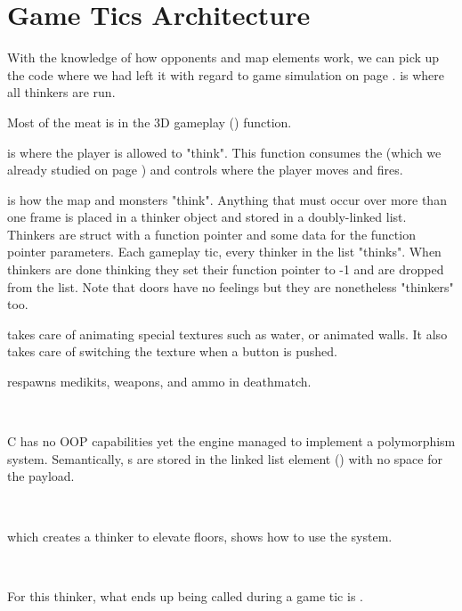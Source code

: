 \section{Game Tics Architecture}
With the knowledge of how opponents and map elements work, we can pick up the code where we had left it with regard to game simulation on page \pageref{TryRunTics.c}.  is where all thinkers are run.\\
\par
{}
\par
Most of the meat is in the 3D gameplay () function.\\
\par
{}
\par
{} is where the player is allowed to "think". This function consumes the  (which we already studied on page \pageref{cmd_t_type}) and controls where the player moves and fires.\\
\par 
{} is how the map and monsters "think". Anything that must occur over more than one frame is placed in a thinker object and stored in a doubly-linked list. Thinkers are struct with a function pointer and some data for the function pointer parameters. Each gameplay tic, every thinker in the list "thinks". When thinkers are done thinking they set their function pointer to -1 and are dropped from the list. Note that doors have no feelings but they are nonetheless "thinkers" too.\\
\par
{} takes care of animating special textures such as water, or animated walls. It also takes care of switching the texture when a button is pushed.\\
\par 

  respawns medikits, weapons, and ammo in deathmatch.




\\
\par
C has no OOP capabilities yet the engine managed to implement a polymorphism system. Semantically, s are stored in the linked list element () with no space for the payload. \\%
\par
{}\\
\par
{} which creates a thinker to elevate floors, shows how to use the system.\\
\par
{}\\
\par
For this thinker, what ends up being called during a game tic is .
